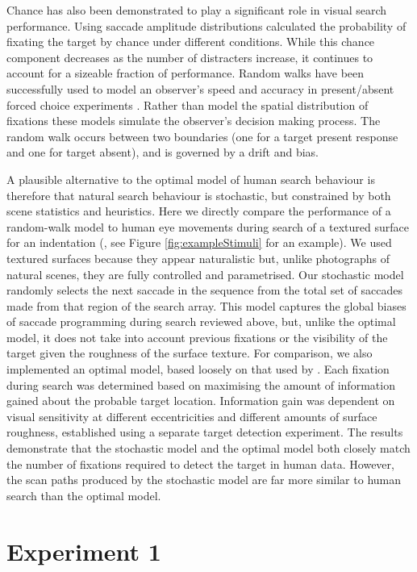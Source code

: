 \documentclass[preprint, authoryear]{elsarticle} %
\begin{document}
\par
Chance has also been demonstrated to play a significant role in visual search performance. Using saccade amplitude distributions \cite{motter-holsapple2001} calculated the probability of fixating the target by chance under different conditions. While this chance component decreases as the number of distracters increase, it continues to account for a sizeable fraction of performance. Random walks have been successfully used to model an observer's speed and accuracy in present/absent forced choice experiments \citep{stone1960, reeves2005}. Rather than model the spatial distribution of fixations these models simulate the observer's decision making process. The random walk occurs between two boundaries (one for a target present response and one for target absent), and is governed by a drift and bias. 
\par
A plausible alternative to the optimal model of human search behaviour is therefore that natural search behaviour is stochastic, but constrained by both scene statistics and heuristics.  Here we directly compare the performance of a random-walk model to human eye movements during search of a textured surface  for an indentation (\cite{clarke2008}, see Figure \ref{fig:exampleStimuli} for an example). We used textured surfaces because they appear naturalistic but, unlike photographs of natural scenes, they are fully controlled and parametrised. Our stochastic model randomly selects the next saccade in the sequence from the total set of saccades made from that region of the search array. This model captures the global biases of saccade programming during search reviewed above, but, unlike the optimal model, it does not take into account previous fixations or the visibility of the target given the roughness of the surface texture. For comparison, we also implemented an optimal model, based loosely on that used by  \cite{najemnik-geisler2005}. Each fixation during search was determined based on maximising the amount of information gained about the probable target location. Information gain was dependent on visual sensitivity at different eccentricities and different amounts of surface roughness, established using a separate target detection experiment. The results demonstrate that the stochastic model and the optimal model both closely match the number of fixations required to detect the target in human data. However, the scan paths produced by the stochastic model are far more similar to human search than the optimal model. 

\section{Experiment 1}
\label{sec:mainExperiment}
\end{document}
